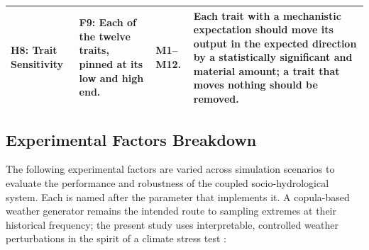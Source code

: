 \documentclass{article}
\begin{document}
\begin{changed}
\begin{tabular}{|p{2.2cm}|p{4.3cm}|p{4.6cm}|p{6.2cm}|}
    \textbf{H8: Trait Sensitivity} & \textbf{F9:} Each of the twelve traits, pinned at its low and high end. & \textbf{M1--M12.} & Each trait with a mechanistic expectation should move its output in the expected direction by a statistically significant and material amount; a trait that moves nothing should be removed. \\ \hline
\end{tabular}
\label{tab:eabss_step2_operationalisation}
\end{changed}

\subsection{Experimental Factors Breakdown}
\begin{changed}
The following experimental factors are varied across simulation scenarios to evaluate the performance and robustness of the coupled socio-hydrological system. Each is named after the parameter that implements it. A copula-based weather generator \cite{Claassen2025} remains the intended route to sampling extremes at their historical frequency; the present study uses interpretable, controlled weather perturbations in the spirit of a climate stress test \cite{Brown2012DecisionScaling}:


\end{changed}
\end{document}
